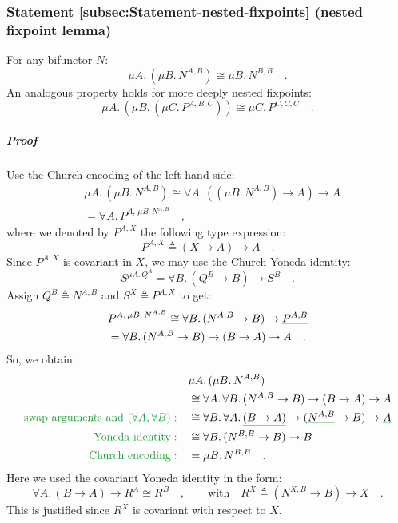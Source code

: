 \subsubsection{Statement \label{subsec:Statement-nested-fixpoints}\ref{subsec:Statement-nested-fixpoints}
(nested fixpoint lemma)}

For any bifunctor $N$:
\[
\mu A.\,(\mu B.\,N^{A,B})\cong\mu B.\,N^{B,B}\quad.
\]
An analogous property holds for more deeply nested fixpoints:
\[
\mu A.\,(\mu B.\,(\mu C.\,P^{A,B,C}))\cong\mu C.\,P^{C,C,C}\quad.
\]


\subparagraph{Proof}

Use the Church encoding of the left-hand side:
\begin{align*}
 & \mu A.\,(\mu B.\,N^{A,B})\cong\forall A.\,((\mu B.\,N^{A,B})\rightarrow A)\rightarrow A\\
 & =\forall A.\,P^{A,\,\mu B.\,N^{A,B}}\quad,
\end{align*}
where we denoted by $P^{A,X}$ the following type expression:
\[
P^{A,X}\triangleq(X\rightarrow A)\rightarrow A\quad.
\]
Since $P^{A,X}$ is covariant in $X$, we may use the Church-Yoneda
identity:
\[
S^{\mu A.\,Q^{A}}=\forall B.\,(Q^{B}\rightarrow B)\rightarrow S^{B}\quad.
\]
Assign $Q^{B}\triangleq N^{A,B}$ and $S^{X}\triangleq P^{A,X}$ to
get:
\begin{align*}
 & P^{A,\,\mu B.\,N^{A,B}}\cong\forall B.\,(N^{A,B}\rightarrow B)\rightarrow\gunderline{P^{A,B}}\\
 & =\forall B.\,(N^{A,B}\rightarrow B)\rightarrow(B\rightarrow A)\rightarrow A\quad.
\end{align*}
So, we obtain:
\begin{align*}
 & \mu A.\,(\mu B.\,N^{A,B})\\
 & \cong\forall A.\,\forall B.\,(N^{A,B}\rightarrow B)\rightarrow(B\rightarrow A)\rightarrow A\\
{\color{greenunder}\text{swap arguments and }(\forall A,\forall B):}\quad & \cong\forall B.\,\forall A.\,\gunderline{(B\rightarrow A)}\rightarrow(\gunderline{N^{A,B}}\rightarrow B)\rightarrow\gunderline A\\
{\color{greenunder}\text{Yoneda identity}:}\quad & \cong\forall B.\,(N^{B,B}\rightarrow B)\rightarrow B\\
{\color{greenunder}\text{Church encoding}:}\quad & =\mu B.\,N^{B,B}\quad.
\end{align*}
Here we used the covariant Yoneda identity in the form:
\[
\forall A.\,(B\rightarrow A)\rightarrow R^{A}\cong R^{B}\quad,\quad\quad\text{with}\quad R^{X}\triangleq(N^{X,B}\rightarrow B)\rightarrow X\quad.
\]
This is justified since $R^{X}$ is covariant with respect to $X$. 

